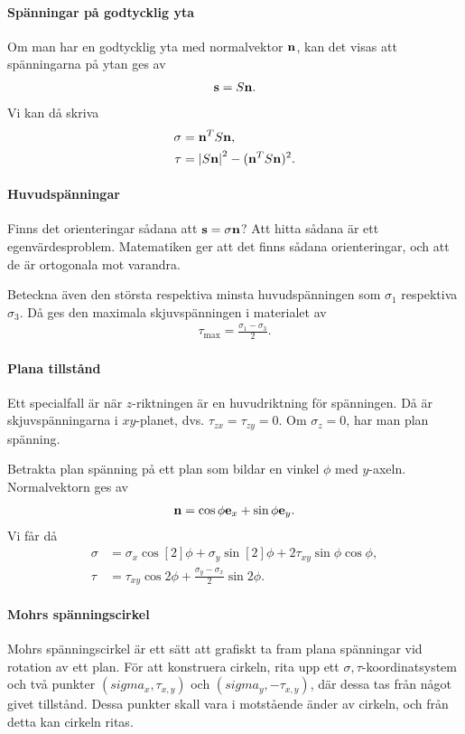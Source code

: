 \paragraph{Spänningar på godtycklig yta}
Om man har en godtycklig yta med normalvektor $\vb{n}$, kan det visas att spänningarna på ytan ges av
\begin{align*}
	\vb{s} = S\vb{n}.
\end{align*}
Vi kan då skriva
\begin{align*}
	\sigma &= \vb{n}^{T}S\vb{n}, \\
	\tau   &= \abs{S\vb{n}}^{2} - (\vb{n}^{T}S\vb{n})^{2}.
\end{align*}

\paragraph{Huvudspänningar}
Finns det orienteringar sådana att $\vb{s} = \sigma\vb{n}$? Att hitta sådana är ett egenvärdesproblem. Matematiken ger att det finns sådana orienteringar, och att de är ortogonala mot varandra.

Beteckna även den största respektiva minsta huvudspänningen som $\sigma_{1}$ respektiva $\sigma_{3}$. Då ges den maximala skjuvspänningen i materialet av
\begin{align*}
	\tau_{\text{max}} = \frac{\sigma_{1} - \sigma_{3}}{2}.
\end{align*}

\paragraph{Plana tillstånd}
Ett specialfall är när $z$-riktningen är en huvudriktning för spänningen. Då är skjuvspänningarna i $xy$-planet, dvs. $\tau_{zx} = \tau_{zy} = 0$. Om $\sigma_{z} = 0$, har man plan spänning.

Betrakta plan spänning på ett plan som bildar en vinkel $\phi$ med $y$-axeln. Normalvektorn ges av
\begin{align*}
	\vb{n} = \cos{\phi}\vb{e}_{x} + \sin{\phi}\vb{e}_{y}.
\end{align*}
Vi får då
\begin{align*}
	\sigma &= \sigma_{x}\cos[2]{\phi} + \sigma_{y}\sin[2]{\phi} + 2\tau_{xy}\sin{\phi}\cos{\phi}, \\
	\tau   &= \tau_{xy}\cos{2\phi} + \frac{\sigma_{y} - \sigma_{x}}{2}\sin{2\phi}.
\end{align*}

\paragraph{Mohrs spänningscirkel}
Mohrs spänningscirkel är ett sätt att grafiskt ta fram plana spänningar vid rotation av ett plan. För att konstruera cirkeln, rita upp ett $\sigma, \tau$-koordinatsystem och två punkter $(sigma_{x}, \tau_{x, y})$ och $(sigma_{y}, -\tau_{x, y})$, där dessa tas från något givet tillstånd. Dessa punkter skall vara i motstående änder av cirkeln, och från detta kan cirkeln ritas.

